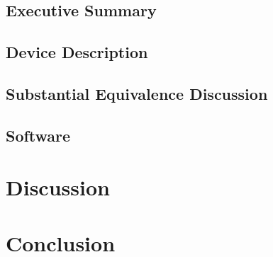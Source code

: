 \documentclass{article}
\begin{document}








\setcounter{subsection}{0}
\subsection{Executive Summary}
\subsection{Device Description}
\subsection{Substantial Equivalence Discussion}





\subsection{Software}




\section{Discussion}
\label{sec:discussion}

\section{Conclusion}
\label{sec:conclusion}


\newpage
{}


\end{document}
